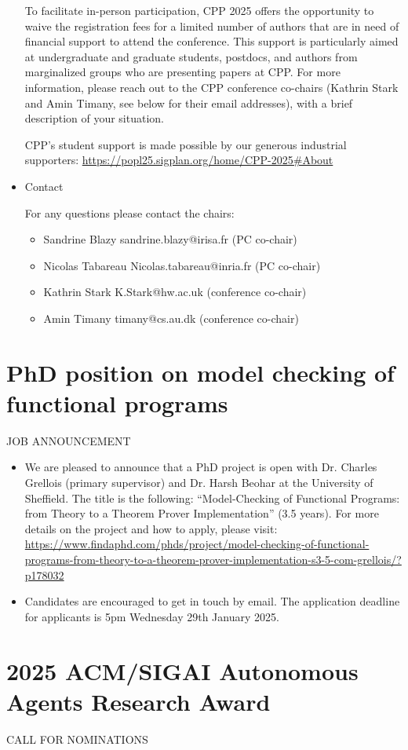 \documentclass[prodmode,acmtecs]{acmsmall} %
\begin{document}
\begin{itemize}
  To facilitate in-person participation, CPP 2025 offers the opportunity to waive the registration fees for a limited number of authors that are in need of financial support to attend the conference. This support is particularly aimed at undergraduate and graduate students, postdocs, and authors from marginalized groups who are presenting papers at CPP. For more information, please reach out to the CPP conference co-chairs (Kathrin Stark and Amin Timany, see below for their email addresses), with a brief description of your situation.   
 
  CPP's student support is made possible by our generous industrial supporters: \href{https://popl25.sigplan.org/home/CPP-2025#About}{https://popl25.sigplan.org/home/CPP-2025\#About} 
 
\item  Contact 
 
  For any questions please contact the chairs: 
 
\begin{itemize}\item  Sandrine Blazy sandrine.blazy@irisa.fr (PC co-chair)
\item  Nicolas Tabareau Nicolas.tabareau@inria.fr (PC co-chair)
\item  Kathrin Stark K.Stark@hw.ac.uk (conference co-chair)
\item  Amin Timany timany@cs.au.dk (conference co-chair)
\end{itemize} 
\end{itemize}\section{PhD position on model checking of functional programs}\label{PhDpositiononmodelcheckingoffunctionalprograms}JOB ANNOUNCEMENT 

\begin{itemize}\item  We are pleased to announce that a PhD project is open with Dr. Charles Grellois (primary supervisor) and Dr. Harsh Beohar at the University of Sheffield. The title is the following: “Model-Checking of Functional Programs: from Theory to a Theorem Prover Implementation” (3.5 years). For more details on the project and how to apply, please visit: \href{https://www.findaphd.com/phds/project/model-checking-of-functional-programs-from-theory-to-a-theorem-prover-implementation-s3-5-com-grellois/?p178032}{https://www.findaphd.com/phds/project/model-checking-of-functional-programs-from-theory-to-a-theorem-prover-implementation-s3-5-com-grellois/?p178032} 
 
\item  Candidates are encouraged to get in touch by email. The application deadline for applicants is 5pm Wednesday 29th January 2025. 
 
\end{itemize}\section{2025 ACM/SIGAI Autonomous Agents Research Award}\label{2025ACMSIGAIAutonomousAgentsResearchAward}CALL FOR NOMINATIONS 
\end{document}
